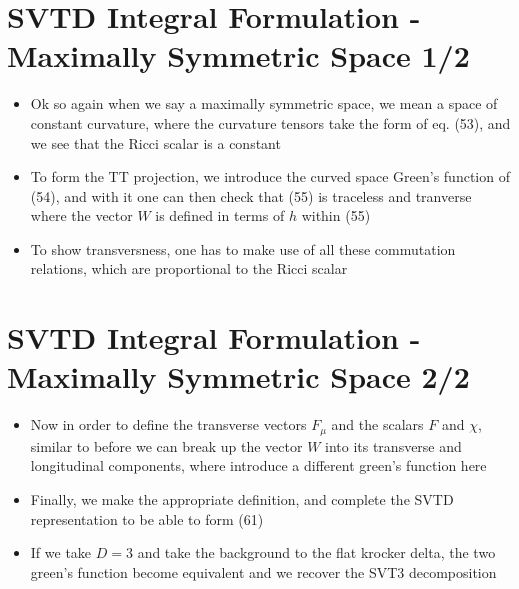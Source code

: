 \documentclass[10pt,letterpaper]{article}
\numberwithin{equation}{section}
\begin{document}

\section{SVTD Integral Formulation - Maximally Symmetric Space 1/2}
\begin{itemize}
	\item Ok so again when we say a maximally symmetric space, we mean a space of constant curvature, where the curvature tensors take the form of eq. (53), and we see that the Ricci scalar is a constant
	\item To form the TT projection, we introduce the curved space Green's function of (54), and with it one can then check that (55) is traceless and tranverse where the vector $W$ is defined in terms of $h$ within (55)
	\item To show transversness, one has to make use of all these commutation relations, which are proportional to the Ricci scalar
\end{itemize}


\section{SVTD Integral Formulation - Maximally Symmetric Space 2/2}
\begin{itemize}
	\item Now in order to define the transverse vectors $F_{\mu}$ and the scalars $F$ and $\chi$, similar to before we can break up the vector $W$ into its transverse and longitudinal components, where introduce a different green's function here
	\item Finally, we make the appropriate definition, and complete the SVTD representation to be able to form (61)
	\item If we take $D=3$ and take the background to the flat krocker delta, the two green's function become equivalent and we recover the SVT3 decomposition
\end{itemize}

\end{document}
